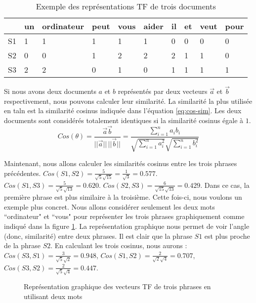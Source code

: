 \documentclass{KodeBook}
\begin{document}
 \begin{table}[ht]
 	\centering
 	\begin{tabular}{llllllllll}
 		\hline\hline
 		& un & ordinateur & peut & vous & aider & il & et & veut & pour \\
 		\hline
 		S1 & 1 & 1 & 1 & 1 & 1 & 0 & 0 & 0 & 0\\
 		S2 & 0 & 0 & 1 & 2 & 2 & 2 & 1 & 1 & 0\\
 		S3 & 2 & 2 & 0 & 1 & 0 & 1 & 1 & 1 & 1\\
 		\hline\hline
 	\end{tabular}
 \caption{Exemple des représentations TF de trois documents}
 \label{tab:tf-exp}
 \end{table}

Si nous avons deux documents $a$ et $b$ représentés par deux vecteurs $\overrightarrow{a}$ et $\overrightarrow{b}$ respectivement, nous pouvons calculer leur similarité. 
La similarité la plus utilisée en \ac{taln} est la similarité cosinus indiquée dans l'équation \ref{eq:cos-sim}.
Les deux documents sont considérés totalement identiques si la similarité cosinus égale à $1$.
\begin{equation}
Cos(\theta) = \frac{\overrightarrow{a} \overrightarrow{b}}{||\overrightarrow{a}||\, ||\overrightarrow{b}||}
= \frac{\sum_{i=1}^{n} a_i b_i}{\sqrt{\sum_{i=1}^{n} a_i^2} \sqrt{\sum_{i=1}^{n} b_i^2}}
\label{eq:cos-sim}
\end{equation}


Maintenant, nous allons calculer les similarités cosinus entre les trois phrases précédentes. 
$Cos(S1, S2) = \frac{5}{\sqrt{5} \sqrt{15}} = \frac{1}{\sqrt{3}} = 0.577$. 
$Cos(S1, S3) = \frac{5}{\sqrt{5} \sqrt{13}} = 0.620$.
$Cos(S2, S3) = \frac{6}{\sqrt{15} \sqrt{13}} = 0.429$.
Dans ce cas, la première phrase est plus similaire à la troisième. 
Cette fois-ci, nous voulons un exemple plus concret.
Nous allons considérer seulement les deux mots ``ordinateur" et ``vous" pour représenter les trois phrases graphiquement comme indiqué dans la figure \ref{fig:tf-repr-graph-exp}.
La représentation graphique nous permet de voir l'angle (donc, similarité) entre deux phrases.
Il est clair que la phrase $S1$ est plus proche de la phrase $S2$.
En calculant les trois cosinus, nous aurons :
$Cos(S3, S1) = \frac{3}{\sqrt{5} \sqrt{2}} = 0.948$, 
$Cos(S1, S2) = \frac{2}{\sqrt{2} \sqrt{4}} = 0.707$,
$Cos(S3, S2) = \frac{2}{\sqrt{5} \sqrt{4}} = 0.447$.
\begin{figure}[ht]
	\centering
{}
\caption{Représentation graphique des vecteurs TF de trois phrases en utilisant deux mots}
\label{fig:tf-repr-graph-exp}
\end{figure}
\end{document}
